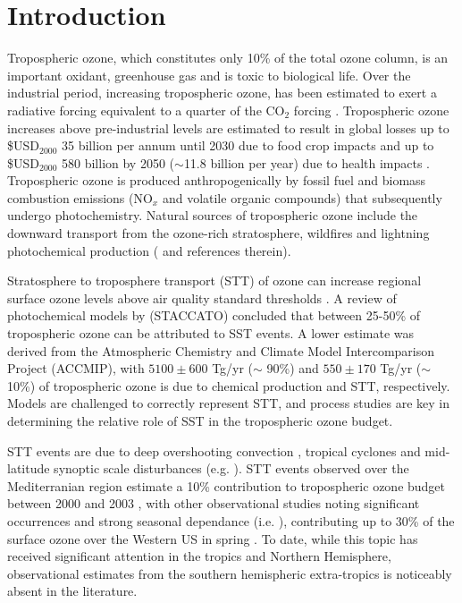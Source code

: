 \documentclass{article}
\begin{document}
\section{Introduction}

    Tropospheric ozone, which constitutes only 10\% of the total ozone column, is an important oxidant, greenhouse gas and is toxic to biological life. 
    Over the industrial period, increasing tropospheric ozone, has been estimated to exert a radiative forcing equivalent to a quarter of the CO$_2$ forcing \citep{IPCC_Chapter2}. Tropospheric ozone increases above pre-industrial levels are estimated to result in global losses up to \$USD$_{2000}$ 35 billion per annum until 2030 due to food crop impacts \citep{Avnery2011} and up to \$USD$_{2000}$ 580 billion by 2050 ($\sim$11.8 billion per year) due to health impacts \citep{Selin2009}. Tropospheric ozone is produced anthropogenically by fossil fuel and biomass combustion emissions (NO$_x$ and volatile organic compounds) that subsequently undergo photochemistry. Natural sources of tropospheric ozone include the downward transport from the ozone-rich stratosphere, wildfires and lightning photochemical production (\citet{Jacobson2000} and references therein). 
 
    Stratosphere to troposphere transport (STT) of ozone can increase regional surface ozone levels above air quality standard thresholds \citep{Danielson1968, Lefohn2011, Langford2012, Zhang2014}. A review of photochemical models by \citet{Stohl2003} (STACCATO) concluded that between 25-50\% of tropospheric ozone can be attributed to SST events. A lower estimate was derived from the Atmospheric Chemistry and Climate Model Intercomparison Project (ACCMIP), \citep{Stevenson2006} with $5100\pm600$ Tg/yr ($\sim$ 90\%) and $550\pm170$ Tg/yr ($\sim$ 10\%) of tropospheric ozone is due to chemical production and STT, respectively. Models are challenged to correctly represent STT, and process studies are key in determining the relative role of SST in the tropospheric ozone budget.
    
    STT events are due to deep overshooting convection \citep{Frey2015}, tropical cyclones \citep{Das2016} and mid-latitude synoptic scale disturbances (e.g. \citet{Stohl2003,Mihalikova2012}). STT events observed over the Mediterranian region estimate a 10\% contribution to tropospheric ozone budget between 2000 and 2003 \citep{Galani2003}, with other observational studies noting significant occurrences and strong seasonal dependance (i.e. \citet{Lefohn2011}), contributing up to 30\% of the surface ozone over the Western US in spring \citep{Lin2012}. To date, while this topic has received significant attention in the tropics and Northern Hemisphere, observational estimates from the southern hemispheric extra-tropics is noticeably absent in the literature. 
    
\end{document}
